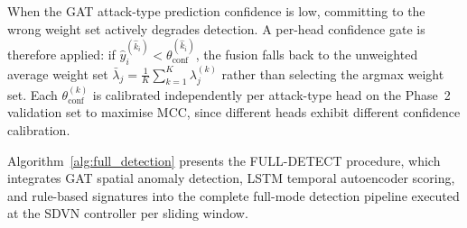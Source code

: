 \documentclass[12pt, a4paper]{report}
\begin{document}
When the GAT attack-type prediction confidence is low, committing
to the wrong weight set actively degrades detection. A per-head
confidence gate is therefore applied: if
$\hat{y}_i^{(\hat{k}_i)} < \theta_{\mathrm{conf}}^{(\hat{k}_i)}$,
the fusion falls back to the unweighted average weight set
$\bar{\lambda}_j = \frac{1}{K}\sum_{k=1}^{K}\lambda_j^{(k)}$
rather than selecting the argmax weight set. Each
$\theta_{\mathrm{conf}}^{(k)}$ is calibrated independently per
attack-type head on the Phase~2 validation set to maximise MCC,
since different heads exhibit different confidence calibration.

Algorithm~\ref{alg:full_detection} presents the FULL-DETECT procedure,
which integrates GAT spatial anomaly detection, LSTM temporal
autoencoder scoring, and rule-based signatures into the complete
full-mode detection pipeline executed at the SDVN controller per
sliding window.
\end{document}
